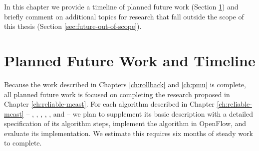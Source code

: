 

In this chapter we provide a timeline of planned future work (Section \ref{sec:future-timeline}) and
briefly comment on additional topics for research that fall outside the scope of this thesis (Section \ref{sec:future-out-of-scope}).

\section{Planned Future Work and Timeline}
\label{sec:future-timeline}

Because the work described in Chapters \ref{ch:rollback} and \ref{ch:pmu} is complete, all planned future work is focused on completing the research proposed in Chapter \ref{ch:reliable-mcast}.
For each algorithm described in Chapter \ref{ch:reliable-mcast} -- \mdrs, \fls, \pcnts, \mfs, \mds, and \mc -- we plan to supplement its basic description with a detailed 
specification of its algorithm steps, implement the algorithm in OpenFlow, and evaluate its implementation.  We estimate this requires six months of steady work to complete.  

